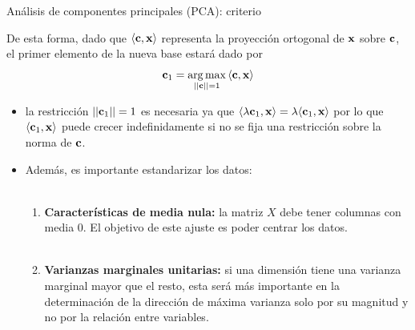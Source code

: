 \documentclass[9pt]{beamer}
\begin{document}
\begin{frame}{Análisis de componentes principales (PCA): criterio}

De esta forma, dado que $\langle\mathbf{c},\mathbf{x}\rangle$ representa la proyección ortogonal de $\mathbf{x}$ sobre $\mathbf{c}$, el primer elemento de la nueva base estará dado por 
\begin{equation*}
	\mathbf{c}_1 = \operatorname*{arg\,max}_{||\mathbf{c}||=1} {\langle\mathbf{c},\mathbf{x}\rangle} \label{eq:PCA_max}
\end{equation*} \pause

\begin{itemize}
	\item la restricción $||\mathbf{c}_1||=1$ es necesaria ya que $\langle\lambda\mathbf{c}_1,\mathbf{x}\rangle = \lambda\langle\mathbf{c}_1,\mathbf{x}\rangle$ por lo que $\langle\mathbf{c}_1,\mathbf{x}\rangle$ puede crecer indefinidamente si no se fija una restricción sobre la norma de $\mathbf{c}$. \pause
	\item Además, es importante estandarizar los datos:\\~\ \pause

	\begin{enumerate}
	\item \textbf{Características de media nula:} la matriz $X$ debe tener columnas con media $0$. El objetivo de este ajuste es poder centrar los datos.\\~\ \pause
	\item \textbf{Varianzas marginales unitarias:} si una dimensión tiene una varianza marginal mayor que el resto, esta será más importante en la determinación de la dirección de máxima varianza solo por su magnitud y no por la relación entre variables.
	\end{enumerate}
\end{itemize}

	
\end{frame}
\end{document}
